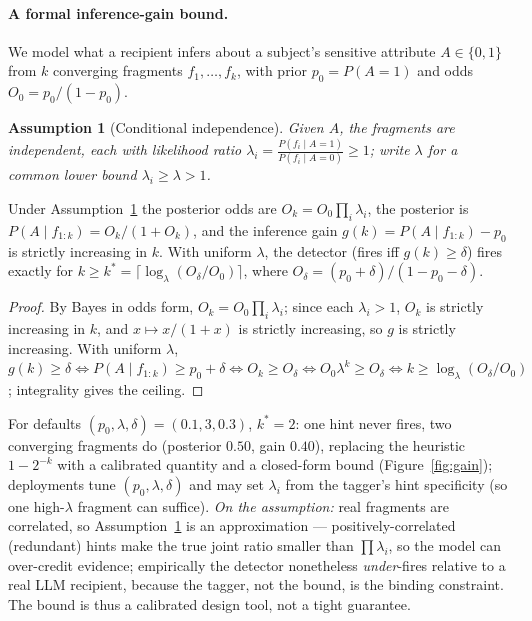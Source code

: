 \documentclass[sigconf,anonymous,review]{acmart}
\theoremstyle{acmplain}
\newtheorem{assumption}{Assumption}
\begin{document}
\paragraph{A formal inference-gain bound.} We model what a recipient infers about
a subject's sensitive attribute $A\in\{0,1\}$ from $k$ converging fragments
$f_1,\dots,f_k$, with prior $p_0=P(A{=}1)$ and odds $O_0=p_0/(1-p_0)$.

\begin{assumption}[Conditional independence]\label{as:ci}
Given $A$, the fragments are independent, each with likelihood ratio
$\lambda_i=\tfrac{P(f_i\mid A{=}1)}{P(f_i\mid A{=}0)}\ge1$; write $\lambda$ for a
common lower bound $\lambda_i\ge\lambda>1$.
\end{assumption}

\begin{proposition}\label{prop:k}
Under Assumption~\ref{as:ci} the posterior odds are $O_k=O_0\prod_i\lambda_i$, the
posterior is $P(A\mid f_{1:k})=O_k/(1+O_k)$, and the inference gain
$g(k)=P(A\mid f_{1:k})-p_0$ is strictly increasing in $k$. With uniform $\lambda$,
the detector (fires iff $g(k)\ge\delta$) fires exactly for
$k\ge k^{*}=\big\lceil\log_\lambda(O_\delta/O_0)\big\rceil$, where
$O_\delta=(p_0+\delta)/(1-p_0-\delta)$.
\end{proposition}
\begin{proof}
By Bayes in odds form, $O_k=O_0\prod_i\lambda_i$; since each $\lambda_i>1$, $O_k$
is strictly increasing in $k$, and $x\mapsto x/(1+x)$ is strictly increasing, so
$g$ is strictly increasing. With uniform $\lambda$, $g(k)\ge\delta \iff
P(A\mid f_{1:k})\ge p_0+\delta \iff O_k\ge O_\delta \iff O_0\lambda^{k}\ge O_\delta
\iff k\ge\log_\lambda(O_\delta/O_0)$; integrality gives the ceiling.
\end{proof}
For defaults $(p_0,\lambda,\delta)=(0.1,3,0.3)$, $k^{*}=2$: one hint never fires,
two converging fragments do (posterior $0.50$, gain $0.40$), replacing the
heuristic $1-2^{-k}$ with a calibrated quantity and a closed-form bound (Figure~\ref{fig:gain});
deployments tune $(p_0,\lambda,\delta)$ and may set $\lambda_i$ from the tagger's
hint specificity (so one high-$\lambda$ fragment can suffice).
\emph{On the assumption:} real fragments are correlated, so
Assumption~\ref{as:ci} is an approximation --- positively-correlated (redundant)
hints make the true joint ratio smaller than $\prod\lambda_i$, so the model can
over-credit evidence; empirically the detector nonetheless \emph{under}-fires
relative to a real LLM recipient, because the tagger, not the bound, is the
binding constraint. The bound is thus a calibrated design tool, not a tight
guarantee.
\end{document}
